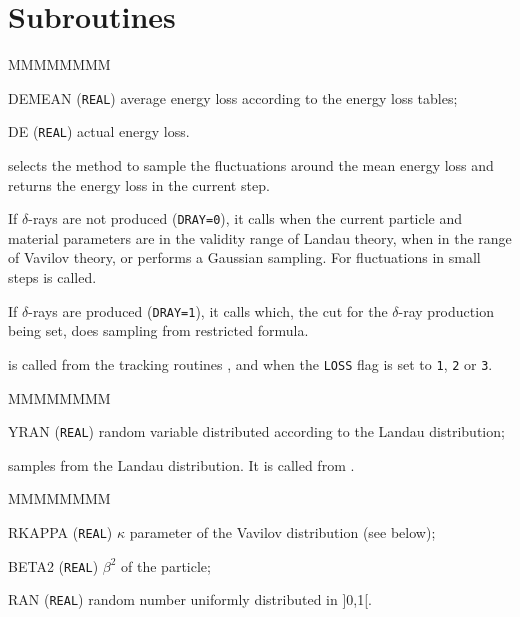  
\section{Subroutines}

\begin{DLtt}{MMMMMMMM}
\item[DEMEAN] ({\tt REAL}) average energy loss according
to the energy loss tables;
\item[DE] ({\tt REAL}) actual energy loss.
\end{DLtt}

 selects the method to sample the
fluctuations around the mean energy loss 
and returns the energy loss  in the current step.

If $\delta$-rays are not produced ({\tt DRAY=0}),
it calls  when the current particle and
material parameters are in the validity range of
Landau theory,  when in the range of
Vavilov theory, or performs a Gaussian sampling.
For fluctuations in small steps  is called.

If $\delta$-rays are produced ({\tt DRAY=1}),
it calls  which, the cut for the
$\delta$-ray production being set, does sampling
from restricted formula.

 is called from the tracking routines
, 
and  when the {\tt LOSS} flag is set
to {\tt 1}, {\tt 2} or {\tt 3}. 

\begin{DLtt}{MMMMMMMM}
\item[YRAN] ({\tt REAL}) random variable distributed according to the Landau
distribution;
\end{DLtt}

 samples from the Landau distribution.
It is called from .

\begin{DLtt}{MMMMMMMM}
\item[RKAPPA] ({\tt REAL}) $\kappa$ parameter of the Vavilov 
distribution (see below);
\item[BETA2] ({\tt REAL}) $\beta^2$ of the particle;
\item[RAN] ({\tt REAL}) random number uniformly distributed in ]0,1[.
\end{DLtt}


